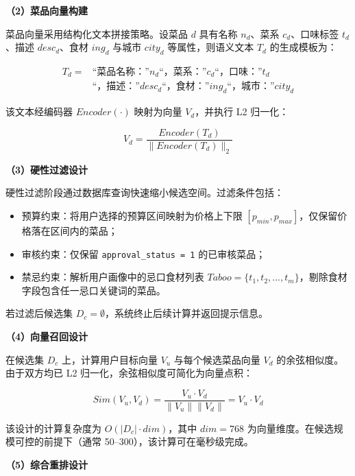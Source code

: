 \textbf{（2）菜品向量构建}

菜品向量采用结构化文本拼接策略。设菜品 $d$ 具有名称 $n_d$、菜系 $c_d$、口味标签 $t_d$、描述 $desc_d$、食材 $ing_d$ 与城市 $city_d$ 等属性，则语义文本 $T_d$ 的生成模板为：

\begin{equation}
\begin{aligned}
T_d = {} & \text{``菜品名称：''} n_d \text{``，菜系：''} c_d \text{``，口味：''} t_d \\
       & \text{``，描述：''} desc_d \text{``，食材：''} ing_d \text{``，城市：''} city_d
\end{aligned}
\end{equation}

该文本经编码器 $Encoder(\cdot)$ 映射为向量 $V_d$，并执行 L2 归一化：

\begin{equation}
V_d = \frac{Encoder(T_d)}{\|Encoder(T_d)\|_2}
\end{equation}

\textbf{（3）硬性过滤设计}

硬性过滤阶段通过数据库查询快速缩小候选空间。过滤条件包括：
\begin{itemize}[leftmargin=2em, itemsep=0.2em]
    \item 预算约束：将用户选择的预算区间映射为价格上下限 $[p_{min}, p_{max}]$，仅保留价格落在区间内的菜品；
    \item 审核约束：仅保留 \texttt{approval\_status = 1} 的已审核菜品；
    \item 禁忌约束：解析用户画像中的忌口食材列表 $Taboo = \{t_1, t_2, ..., t_m\}$，剔除食材字段包含任一忌口关键词的菜品。
\end{itemize}

若过滤后候选集 $D_c = \emptyset$，系统终止后续计算并返回提示信息。

\textbf{（4）向量召回设计}

在候选集 $D_c$ 上，计算用户目标向量 $V_u$ 与每个候选菜品向量 $V_d$ 的余弦相似度。由于双方均已 L2 归一化，余弦相似度可简化为向量点积：

\begin{equation}
Sim(V_u, V_d) = \frac{V_u \cdot V_d}{\|V_u\| \|V_d\|} = V_u \cdot V_d
\end{equation}

该设计的计算复杂度为 $O(|D_c| \cdot dim)$，其中 $dim = 768$ 为向量维度。在候选规模可控的前提下（通常 50--300），该计算可在毫秒级完成。

\textbf{（5）综合重排设计}

